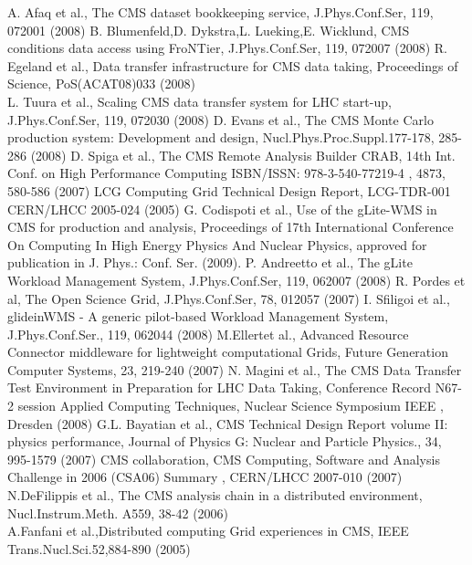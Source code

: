 \begin{thebibliography}{}
%
A. Afaq et al., The CMS dataset bookkeeping service, J.Phys.Conf.Ser, 119, 072001 (2008)
%
B. Blumenfeld,D. Dykstra,L. Lueking,E. Wicklund, CMS conditions data access using FroNTier, J.Phys.Conf.Ser, 119, 072007 (2008)
%
R. Egeland et al., Data transfer infrastructure for CMS data taking, Proceedings of Science, PoS(ACAT08)033 (2008)\\
L. Tuura et al., Scaling CMS data transfer system for LHC start-up, J.Phys.Conf.Ser, 119, 072030 (2008)
%
D. Evans et al., The CMS Monte Carlo production system: Development and design, Nucl.Phys.Proc.Suppl.177-178, 285-286 (2008)
%
D. Spiga et al., The CMS Remote Analysis Builder CRAB, 14th Int. Conf. on High Performance Computing ISBN/ISSN: 978-3-540-77219-4 , 4873, 580-586 (2007)
%
LCG Computing Grid Technical Design Report, LCG-TDR-001 CERN/LHCC 2005-024 (2005)
%
G. Codispoti et al., Use of the gLite-WMS in CMS for production and analysis, Proceedings of 17th International Conference On Computing In High Energy Physics And Nuclear Physics, approved for publication in J. Phys.: Conf. Ser. (2009). 
%
 P. Andreetto et al., The gLite Workload Management System, J.Phys.Conf.Ser, 119, 062007 (2008)
%
 R. Pordes et al, The Open Science Grid, J.Phys.Conf.Ser, 78, 012057 (2007)
%
 I. Sfiligoi et al., glideinWMS - A generic pilot-based Workload Management System, J.Phys.Conf.Ser., 119, 062044 (2008)
%
 M.Ellertet al., Advanced Resource Connector middleware
  for lightweight computational Grids, Future Generation Computer Systems, 23, 219-240 (2007)
%
 N. Magini et al., The CMS Data Transfer Test Environment in Preparation for LHC Data Taking, Conference Record N67-2 session Applied Computing Techniques, Nuclear Science Symposium IEEE , Dresden (2008)
%
 G.L. Bayatian et al., CMS Technical Design Report volume II: physics performance, Journal of Physics G: Nuclear and Particle Physics., 34, 995-1579 (2007)
%
CMS collaboration,  CMS Computing, Software and Analysis Challenge in 2006 (CSA06) Summary , %
CERN/LHCC 2007-010 (2007) \\
N.DeFilippis et al., The CMS analysis chain in a distributed environment, Nucl.Instrum.Meth. A559, 38-42 (2006) \\
A.Fanfani et al.,Distributed computing Grid experiences in CMS, IEEE Trans.Nucl.Sci.52,884-890 (2005)
\end{thebibliography}




